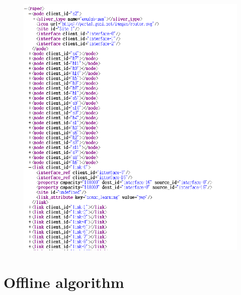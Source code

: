 \documentclass[a4paper,12pt]{report}
\begin{document}
\begin{large}
\begin{figure}
            \includegraphics[width=1.0\textwidth]{rspec_format.png}
      	\end{figure}
   \section{Offline algorithm}

\end{large}
\end{document}
